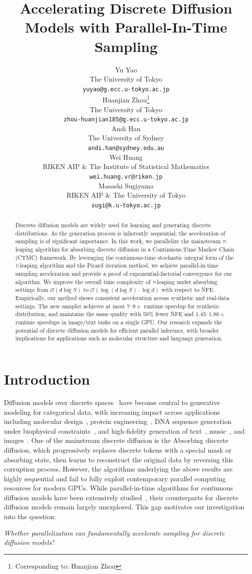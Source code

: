 \documentclass{article}
\title{Accelerating Discrete Diffusion Models with Parallel-In-Time Sampling}
\author{
  Yu Yao \\
  The University of Tokyo\\
  \texttt{yuyao@g.ecc.u-tokyo.ac.jp} \\
  \And
  Huanjian Zhou\thanks{Corresponding to: Huanjian Zhou} \\
  The University of Tokyo \\
  \texttt{zhou-huanjian185@g.ecc.u-tokyo.ac.jp} \\
  \And
  Andi Han \\
  The University of Sydney \\
  \texttt{andi.han@sydney.edu.au} \\
  \And
  Wei Huang \\
  RIKEN AIP \& The Institute of Statistical Mathematics \\
  \texttt{wei.huang.vr@riken.jp} \\
  \And
  Masashi Sugiyama \\
  RIKEN AIP \& The University of Tokyo \\
  \texttt{sugi@k.u-tokyo.ac.jp} \\
}
\begin{document}
\maketitle


\begin{abstract}
Discrete diffusion models are widely used for learning and generating discrete distributions. As the generation process is inherently sequential, the acceleration of sampling is of significant importance.
In this work, we parallelize the mainstream $\tau$-leaping algorithm for absorbing discrete diffusion in a Continuous-Time Markov Chain (CTMC) framework. By leveraging the continuous-time stochastic integral form of the $\tau$-leaping algorithm and the Picard iteration method, we achieve parallel-in-time sampling acceleration and provide a proof of exponential-factorial convergence for our algorithm. We improve the overall time complexity of $\tau$-leaping under absorbing settings from ${\mathcal{O}}(d \log S)$ to ${\mathcal{O}}(\log (d\log S)\cdot \log d)$ with respect to NFE. Empirically, our method shows consistent acceleration across synthetic and real-data settings. The new sampler achieves at most $7$--$9\times$ runtime speedup for synthetic distribution, and maintains the same quality with $50\%$ fewer NFE and $1.45$--$1.86\times$ runtime speedups in image/text tasks on a single GPU. Our research expands the potential of discrete diffusion models for efficient parallel inference, with broader implications for applications such as molecular structure and language generation.
\end{abstract}




\section{Introduction}
Diffusion models over discrete spaces~\citep{austin2021structured} have become central to generative modeling for categorical data, with increasing impact across applications including molecular design~\citep{vignac2022digres}, protein engineering~\citep{gruver2023protein}, DNA sequence generation under biophysical constraints~\citep{sarkar2024designing}, and high-fidelity generation of text~\citep{zheng2023reparameterized}, music~\citep{yang2023diffsound}, and images~\citep{lezama2022discrete}. One of the mainstream discrete diffusion is the Absorbing discrete diffusion, which progressively replaces discrete tokens with a special mask or absorbing state, then learns to reconstruct the original data by reversing this corruption process. However, the algorithms underlying the above results are highly sequential and fail to fully exploit contemporary parallel computing resources for modern GPUs. While parallel-in-time algorithms for continuous diffusion models have been extensively studied~\citep{anari2024fast,chen2024accelerating, shih2023parallel, zhouparallel}, their counterparts for discrete diffusion models remain largely unexplored. This gap motivates our investigation into the question:
\begin{center}
\textit{Whether parallelization can fundamentally accelerate sampling for discrete diffusion models}?
\end{center}
\end{document}
